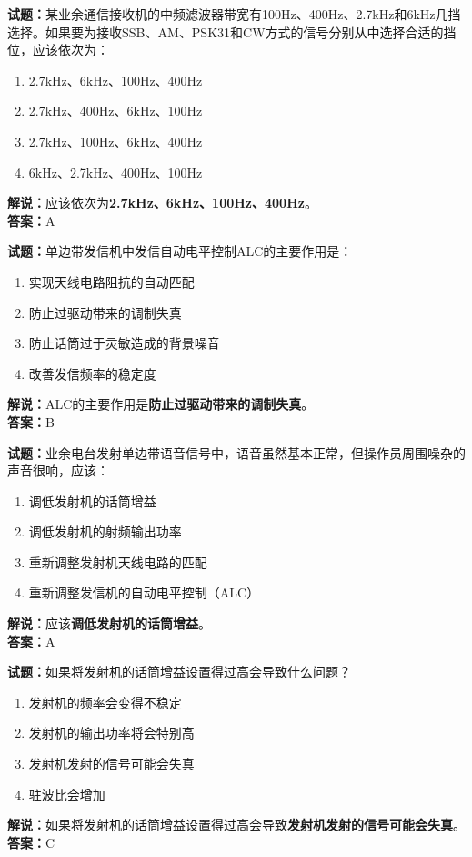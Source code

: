 \documentclass{ctexbook}
\begin{document}
\bigskip


\noindent\textbf{试题：}某业余通信接收机的中频滤波器带宽有100Hz、400Hz、2.7\unit{\kHz}和6\unit{\kHz}几挡选择。如果要为接收SSB、AM、PSK31和CW方式的信号分别从中选择合适的挡位，应该依次为：
\begin{enumerate}[leftmargin=3em]
\item 2.7\unit{\kHz}、6\unit{\kHz}、100Hz、400Hz
\item 2.7\unit{\kHz}、400Hz、6\unit{\kHz}、100Hz
\item 2.7\unit{\kHz}、100Hz、6\unit{\kHz}、400Hz
\item 6\unit{\kHz}、2.7\unit{\kHz}、400Hz、100Hz
\end{enumerate}
\noindent\textbf{解说：}应该依次为\textbf{2.7\unit{\kHz}、6\unit{\kHz}、100Hz、400Hz}。\\\noindent\textbf{答案：}A




\bigskip


\noindent\textbf{试题：}单边带发信机中发信自动电平控制ALC的主要作用是：
\begin{enumerate}[leftmargin=3em]
\item 实现天线电路阻抗的自动匹配
\item 防止过驱动带来的调制失真
\item 防止话筒过于灵敏造成的背景噪音
\item 改善发信频率的稳定度
\end{enumerate}
\noindent\textbf{解说：}ALC的主要作用是\textbf{防止过驱动带来的调制失真}。\\\noindent\textbf{答案：}B




\bigskip


\noindent\textbf{试题：}业余电台发射单边带语音信号中，语音虽然基本正常，但操作员周围噪杂的声音很响，应该：
\begin{enumerate}[leftmargin=3em]
\item 调低发射机的话筒增益
\item 调低发射机的射频输出功率
\item 重新调整发射机天线电路的匹配
\item 重新调整发信机的自动电平控制（ALC）
\end{enumerate}
\noindent\textbf{解说：}应该\textbf{调低发射机的话筒增益}。\\\noindent\textbf{答案：}A




\bigskip


\noindent\textbf{试题：}如果将发射机的话筒增益设置得过高会导致什么问题？
\begin{enumerate}[leftmargin=3em]
\item 发射机的频率会变得不稳定
\item 发射机的输出功率将会特别高
\item 发射机发射的信号可能会失真
\item 驻波比会增加
\end{enumerate}
\noindent\textbf{解说：}如果将发射机的话筒增益设置得过高会导致\textbf{发射机发射的信号可能会失真}。\\\noindent\textbf{答案：}C
\end{document}

